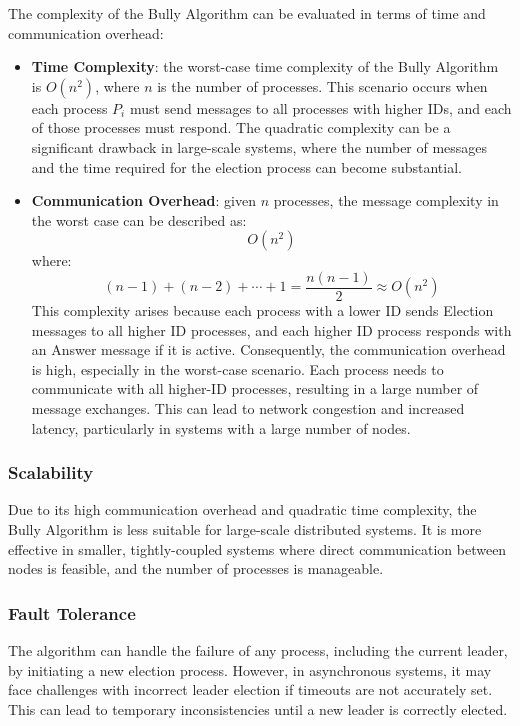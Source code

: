 The complexity of the Bully Algorithm can be evaluated in terms of time and communication overhead:
\begin{itemize}
    \item \textbf{Time Complexity}: the worst-case time complexity of the Bully Algorithm is \(O(n^2)\), where \(n\) is the number of processes. This scenario occurs when each process \(P_i\) must send messages to all processes with higher IDs, and each of those processes must respond. The quadratic complexity can be a significant drawback in large-scale systems, where the number of messages and the time required for the election process can become substantial.
    \item \textbf{Communication Overhead}: given \(n\) processes, the message complexity in the worst case can be described as:
\[ O(n^2) \]
where:
\[ (n-1) + (n-2) + \cdots + 1 = \frac{n(n-1)}{2} \approx O(n^2) \]
This complexity arises because each process with a lower ID sends Election messages to all higher ID processes, and each higher ID process responds with an Answer message if it is active. Consequently, the communication overhead is high, especially in the worst-case scenario. Each process needs to communicate with all higher-ID processes, resulting in a large number of message exchanges. This can lead to network congestion and increased latency, particularly in systems with a large number of nodes.

\end{itemize}

\subsubsection{Scalability}

Due to its high communication overhead and quadratic time complexity, the Bully Algorithm is less suitable for large-scale distributed systems. It is more effective in smaller, tightly-coupled systems where direct communication between nodes is feasible, and the number of processes is manageable.

\subsubsection{Fault Tolerance}

The algorithm can handle the failure of any process, including the current leader, by initiating a new election process. However, in asynchronous systems, it may face challenges with incorrect leader election if timeouts are not accurately set. This can lead to temporary inconsistencies until a new leader is correctly elected.

